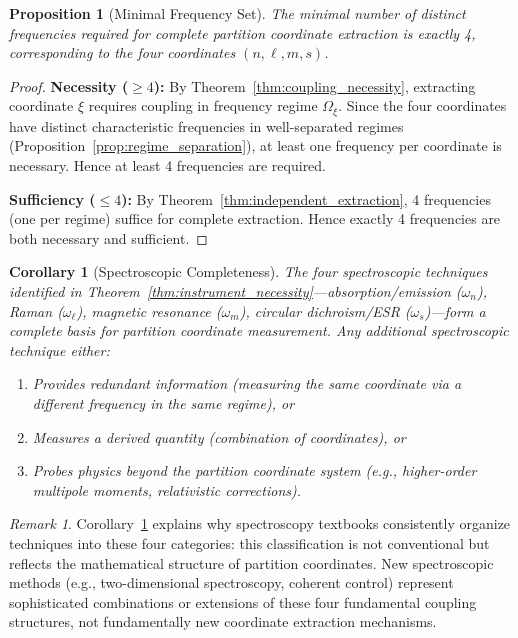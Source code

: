 \documentclass[twocolumn,10pt,a4paper]{article}
\newtheorem{corollary}[theorem]{Corollary}
\newtheorem{proposition}[theorem]{Proposition}
\theoremstyle{remark}
\newtheorem{remark}[theorem]{Remark}
\begin{document}
\begin{proposition}[Minimal Frequency Set]
\label{prop:minimal_frequency_set}
The minimal number of distinct frequencies required for complete partition coordinate extraction is exactly 4, corresponding to the four coordinates $(n, \ell, m, s)$.
\end{proposition}

\begin{proof}
\textbf{Necessity ($\geq 4$):} By Theorem~\ref{thm:coupling_necessity}, extracting coordinate $\xi$ requires coupling in frequency regime $\Omega_\xi$. Since the four coordinates have distinct characteristic frequencies in well-separated regimes (Proposition~\ref{prop:regime_separation}), at least one frequency per coordinate is necessary. Hence at least 4 frequencies are required.

\textbf{Sufficiency ($\leq 4$):} By Theorem~\ref{thm:independent_extraction}, 4 frequencies (one per regime) suffice for complete extraction. Hence exactly 4 frequencies are both necessary and sufficient.
\end{proof}

\begin{corollary}[Spectroscopic Completeness]
\label{cor:spectroscopic_completeness}
The four spectroscopic techniques identified in Theorem~\ref{thm:instrument_necessity}—absorption/emission ($\omega_n$), Raman ($\omega_\ell$), magnetic resonance ($\omega_m$), circular dichroism/ESR ($\omega_s$)—form a complete basis for partition coordinate measurement. Any additional spectroscopic technique either:
\begin{enumerate}[label=(\roman*), noitemsep]
    \item Provides redundant information (measuring the same coordinate via a different frequency in the same regime), or
    \item Measures a derived quantity (combination of coordinates), or
    \item Probes physics beyond the partition coordinate system (e.g., higher-order multipole moments, relativistic corrections).
\end{enumerate}
\end{corollary}

\begin{remark}
Corollary~\ref{cor:spectroscopic_completeness} explains why spectroscopy textbooks consistently organize techniques into these four categories: this classification is not conventional but reflects the mathematical structure of partition coordinates. New spectroscopic methods (e.g., two-dimensional spectroscopy, coherent control) represent sophisticated combinations or extensions of these four fundamental coupling structures, not fundamentally new coordinate extraction mechanisms.
\end{remark}
\end{document}
